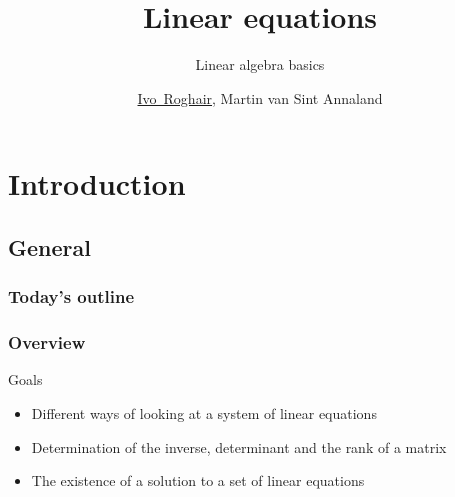 \documentclass[11pt,table,final,xcolor={usenames,dvipsnames,table}]{beamer}
\title{Linear equations}
\subtitle{Linear algebra basics}
\author[I.~Roghair]{\underline{Ivo~Roghair}, Martin van Sint Annaland}
\institute[SPI]{{Chemical Process Intensification,\\
  Eindhoven University of Technology}}
\date
\begin{document}


\frame[plain]{
  \titlepage
}
\section{Introduction}
\subsection*{General}
\begin{frame}[label=contents]
  \frametitle{Today's outline}
\end{frame}

\begin{frame}
  \frametitle{Overview}
  \begin{block}{Goals}
    \begin{itemize}
      \item Different ways of looking at a system of linear equations
      \item Determination of the inverse, determinant and the rank of a matrix
      \item The existence of a solution to a set of linear equations
  \end{itemize}
  \end{block}
\end{frame}
% 
\end{document}
